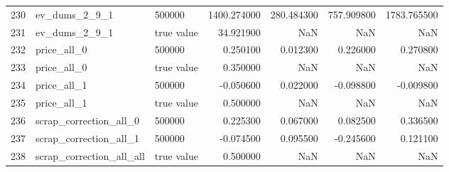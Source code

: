 \begin{tabular}{lllrrrr}
230 & ev_dums_2_9_1 & 500000 & 1400.274000 & 280.484300 & 757.909800 & 1783.765500 \\
231 & ev_dums_2_9_1 & true value & 34.921900 & NaN & NaN & NaN \\
232 & price_all_0 & 500000 & 0.250100 & 0.012300 & 0.226000 & 0.270800 \\
233 & price_all_0 & true value & 0.350000 & NaN & NaN & NaN \\
234 & price_all_1 & 500000 & -0.050600 & 0.022000 & -0.098800 & -0.009800 \\
235 & price_all_1 & true value & 0.500000 & NaN & NaN & NaN \\
236 & scrap_correction_all_0 & 500000 & 0.225300 & 0.067000 & 0.082500 & 0.336500 \\
237 & scrap_correction_all_1 & 500000 & -0.074500 & 0.095500 & -0.245600 & 0.121100 \\
238 & scrap_correction_all_all & true value & 0.500000 & NaN & NaN & NaN \\
\bottomrule
\end{tabular}
